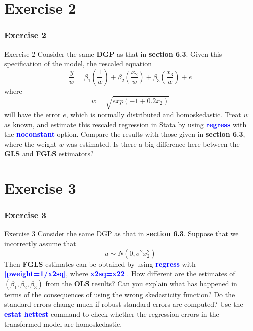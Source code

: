 \documentclass[11pt, aspectratio=169]{beamer}
\begin{document}
	\section{Exercise 2}
		\begin{frame}[t]
			\frametitle{Exercise 2}
			\begin{block}{Exercise 2}
				Consider the same \textbf{DGP} as that in \textcolor{red!50}{\textbf{section 6.3}}. Given this specification
				of the model, the rescaled equation
					\begin{equation}
						\dfrac{y}{w} = \beta_{1}\left(\dfrac{1}{w}\right) + \beta_{2}\left(\dfrac{x_{2}}{w}\right) + \beta_{3}\left(\dfrac{x_{3}}{w}\right) + e
					\end{equation}
				where
					\begin{equation}
						w = \sqrt{exp\left(-1 + 0.2x_{2}\right)}
					\end{equation}
				will have the error $e$, which is normally distributed and homoskedastic.
				Treat $w$ as known, and estimate this rescaled regression in Stata by 
				using \textcolor{blue}{\textbf{regress}} with the \textcolor{blue}{\textbf{noconstant}} option. 
				Compare the results with those given in \textcolor{red!50}{\textbf{section 6.3}}, where the
				weight $w$ was estimated. Is there a big difference here between the \textbf{GLS} and \textbf{FGLS} estimators?
			\end{block}
		\end{frame}
	\section{Exercise 3}
		\begin{frame}
			\frametitle{Exercise 3}
			\begin{block}{Exercise 3}
				Consider the same DGP as that in \textcolor{red!50}{\textbf{section 6.3}}. Suppose that we
				incorrectly assume that 
					\begin{equation}
						u \sim N\left(0, \sigma^{2}x_{2}^{2}\right)
					\end{equation}
				Then \textbf{FGLS} estimates can be obtained by using \textcolor{blue}{\textbf{regress}} with \textcolor{blue}{\textbf{[pweight=1/x2sq]}}, where \textcolor{blue}{\textbf{x2sq=x22}} .
				How different are the estimates of $(\beta_{1}, \beta_{2}, \beta_{3})$ from the \textbf{OLS} results?
				Can you explain what has happened in terms of the consequences of
				using the wrong skedasticity function? Do the standard errors change
				much if robust standard errors are computed? Use the \textcolor{blue}{\textbf{estat hettest}}
				command to check whether the regression errors in the transformed
				model are homoskedastic.
			\end{block}
		\end{frame}
\end{document}

